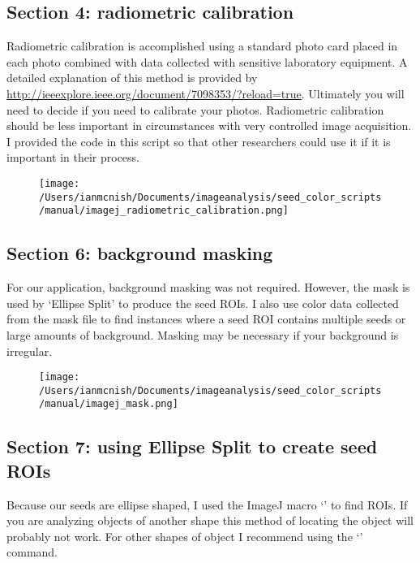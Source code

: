 \documentclass[12pt]{article}
\begin{document}
\subsection{Section 4: radiometric calibration}\label{sec:imagej_radiometrics_calibration}

\noindent Radiometric calibration is accomplished using a standard photo card placed in each photo combined with data collected with sensitive laboratory equipment. A detailed explanation of this method is provided by \url{http://ieeexplore.ieee.org/document/7098353/?reload=true}. Ultimately you will need to decide if you need to calibrate your photos. Radiometric calibration should be less important in circumstances with very controlled image acquisition. I provided the code in this script so that other researchers could use it if it is important in their process.\\

\begin{figure}[H]
	\centering
	\texttt{[image: /Users/ianmcnish/Documents/imageanalysis/seed\_color\_scripts/manual/imagej\_radiometric\_calibration.png]}
	\label{fig:imagej_radiometric_calibration}
\end{figure}

\subsection{Section 6: background masking}\label{sec:imagej_background_masking}

\noindent For our application, background masking was not required. However, the mask is used by `Ellipse Split' to produce the seed ROIs. I also use color data collected from the mask file to find instances where a seed ROI contains multiple seeds or large amounts of background. Masking may be necessary if your background is irregular.\\

\begin{figure}[H]
	\centering
	\texttt{[image: /Users/ianmcnish/Documents/imageanalysis/seed\_color\_scripts/manual/imagej\_mask.png]}
	\label{fig:imagej_mask}
\end{figure}

\subsection{Section 7: using Ellipse Split to create seed ROIs}\label{sec:imagej_ellipse_split}

\noindent Because our seeds are ellipse shaped, I used the ImageJ macro `' to find ROIs. If you are analyzing objects of another shape this method of locating the object will probably not work. For other shapes of object I recommend using the `'  command.\\
\end{document}
